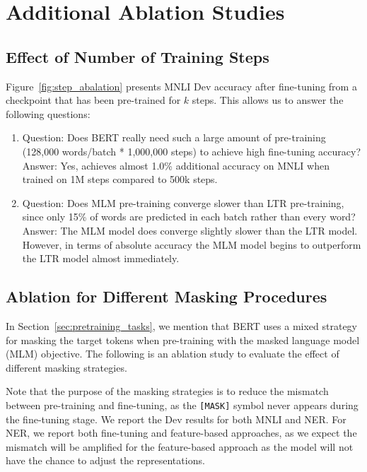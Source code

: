 
\section{Additional Ablation Studies}
\label{appendix:sec:more_ablation_studies}

\subsection{Effect of Number of Training Steps}
\label{sec:num_training_steps}

Figure~\ref{fig:step_abalation} presents MNLI Dev accuracy after fine-tuning from a checkpoint that has been pre-trained for $k$ steps. This allows us to answer the following questions:



\begin{enumerate}
\item Question: Does BERT really need such a large amount of pre-training (128,000 words/batch * 1,000,000 steps) to achieve high fine-tuning accuracy? \\
Answer: Yes, \bertbase achieves almost 1.0\% additional accuracy on MNLI when trained on 1M steps compared to 500k steps.
\item Question: Does MLM pre-training converge slower than LTR pre-training, since only 15\% of words are predicted in each batch rather than every word? \\
Answer: The MLM model does converge slightly slower than the LTR model. However, in terms of absolute accuracy the MLM model begins to outperform the LTR model almost immediately.
\end{enumerate}

\subsection{Ablation for Different Masking Procedures}
\label{appendix:sec:different_masks}

In Section~\ref{sec:pretraining_tasks}, we mention that BERT uses a mixed strategy for masking the target tokens when pre-training with the masked language
model (MLM) objective. The following is an ablation study to evaluate the effect of different masking strategies.

Note that the purpose of the masking strategies is to reduce the mismatch
between pre-training and fine-tuning, as the {\tt [MASK]} symbol never appears during the fine-tuning stage. We report the Dev results for both
MNLI and NER. For NER, we report both fine-tuning and feature-based approaches,
as we expect the mismatch will be amplified for the feature-based approach as
the model will not have the chance to adjust the representations.

